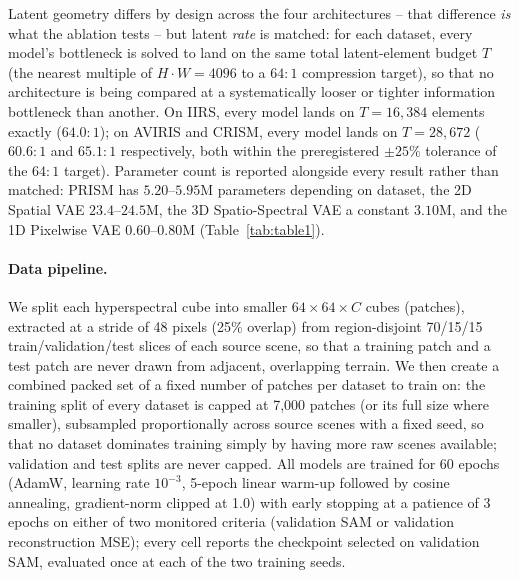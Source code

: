 \documentclass{article} %
\begin{document}
Latent geometry differs by design across the four architectures -- that difference \emph{is} what the ablation tests -- but latent \emph{rate} is matched: for each dataset, every model's bottleneck is solved to land on the same total latent-element budget $T$ (the nearest multiple of $H \cdot W = 4096$ to a $64{:}1$ compression target), so that no architecture is being compared at a systematically looser or tighter information bottleneck than another. On IIRS, every model lands on $T = 16{,}384$ elements exactly ($64.0{:}1$); on AVIRIS and CRISM, every model lands on $T = 28{,}672$ ($60.6{:}1$ and $65.1{:}1$ respectively, both within the preregistered $\pm25\%$ tolerance of the $64{:}1$ target). Parameter count is reported alongside every result rather than matched: PRISM has $5.20$--$5.95$M parameters depending on dataset, the 2D Spatial VAE $23.4$--$24.5$M, the 3D Spatio-Spectral VAE a constant $3.10$M, and the 1D Pixelwise VAE $0.60$--$0.80$M (Table~\ref{tab:table1}).

\paragraph{Data pipeline.} We split each hyperspectral cube into smaller $64{\times}64{\times}C$ cubes (patches), extracted at a stride of 48 pixels (25\% overlap) from region-disjoint 70/15/15 train/validation/test slices of each source scene, so that a training patch and a test patch are never drawn from adjacent, overlapping terrain. We then create a combined packed set of a fixed number of patches per dataset to train on: the training split of every dataset is capped at 7{,}000 patches (or its full size where smaller), subsampled proportionally across source scenes with a fixed seed, so that no dataset dominates training simply by having more raw scenes available; validation and test splits are never capped. All models are trained for 60 epochs (AdamW, learning rate $10^{-3}$, 5-epoch linear warm-up followed by cosine annealing, gradient-norm clipped at 1.0) with early stopping at a patience of 3 epochs on either of two monitored criteria (validation SAM or validation reconstruction MSE); every cell reports the checkpoint selected on validation SAM, evaluated once at each of the two training seeds.
\end{document}
